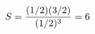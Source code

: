 \documentclass[preview]{standalone}
\begin{document}
\begin{align*}
\special{dvisvgm:raw <g id='unique000'>}S=\dfrac{(1/2)(3/2)}{(1/2)^3}=6\special{dvisvgm:raw </g>}
\end{align*}
\end{document}
